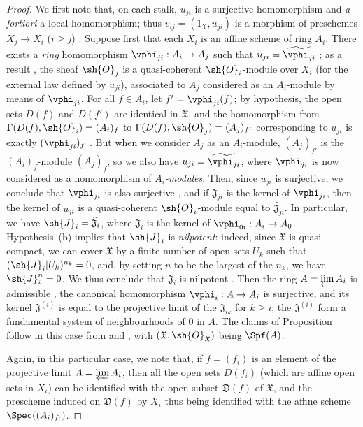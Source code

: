 \begin{proof}
We first note that, on each stalk, $u_{ji}$ is a surjective homomorphism and \emph{a fortiori} a local homomorphism; thus $v_{ij}=(1_\mathfrak{X},u_{ji})$ is a morphism of preschemes $X_j\to X_i$ ($i\geq j$) .
Suppose first that each $X_i$ is an affine scheme of ring $A_i$.
There exists a \emph{ring} homomorphism $\vphi_{ji}:A_i\to A_j$ such that $u_{ji}=\widetilde{\vphi_{ji}}$ ; as a result , the sheaf $\sh{O}_j$ is a quasi-coherent $\sh{O}_i$-module over $X_i$ (for the external law defined by $u_{ji}$), associated to $A_j$ considered as an $A_i$-module by means of $\vphi_{ji}$.
For all $f\in A_i$, let $f'=\vphi_{ji}(f)$; by hypothesis, the open sets $D(f)$ and $D(f')$ are identical in $\mathfrak{X}$, and the homomorphism from $\Gamma(D(f),\sh{O}_i)=(A_i)_f$ to $\Gamma(D(f),\sh{O}_j)=(A_j)_{f'}$ corresponding to $u_{ji}$ is exactly $(\vphi_{ji})_f$ .
But when we consider $A_j$ as an $A_i$-module, $(A_j)_{f'}$ is the $(A_i)_f$-module $(A_j)_f$, so we also have $u_{ji}=\widetilde{\vphi_{ji}}$, where $\vphi_{ji}$ is now considered as a homomorphism of \emph{$A_i$-modules}.
Then, since $u_{ji}$ is surjective, we conclude that $\vphi_{ji}$ is also surjective , and if $\mathfrak{J}_{ji}$ is the kernel of $\vphi_{ji}$, then the kernel of $u_{ji}$ is a quasi-coherent $\sh{O}_i$-module equal to $\widetilde{\mathfrak{J}_{ji}}$.
In particular, we have $\sh{J}_i=\widetilde{\mathfrak{J}_i}$, where $\mathfrak{J}_i$ is the kernel of $\vphi_{0i}:A_i\to A_0$.
Hypothesis~(b) implies that $\sh{J}_i$ is \emph{nilpotent}: indeed, since $\mathfrak{X}$ is quasi-compact, we can cover $\mathfrak{X}$ by a finite number of open sets $U_k$ such that $(\sh{J}_i|U_k)^{n_k}=0$, and, by setting $n$ to be the largest of the $n_k$, we have $\sh{J}_i^n=0$.
We thus conclude that $\mathfrak{J}_i$ is nilpotent .
Then the ring $A=\varprojlim A_i$ is admissible , the canonical homomorphism $\vphi_i:A\to A_i$ is surjective, and its kernel $\mathfrak{J}^{(i)}$ is equal to the projective limit of the $\mathfrak{J}_{ik}$ for $k\geq i$; the $\mathfrak{J}^{(i)}$ form a fundamental system of neighbourhoods of $0$ in $A$.
The claims of Proposition  follow in this case from  and , with $(\mathfrak{X},\sh{O}_\mathfrak{X})$ being $\Spf(A)$.

Again, in this particular case, we note that, if $f=(f_i)$ is an element of the projective limit $A=\varprojlim A_i$, then all the open sets $D(f_i)$ (which are affine open sets in $X_i$) can be identified with the open subset $\mathfrak{D}(f)$ of $\mathfrak{X}$, and the prescheme induced on $\mathfrak{D}(f)$ by $X_i$ thus being identified with the affine scheme $\Spec((A_i)_{f_i})$.


\end{proof}
